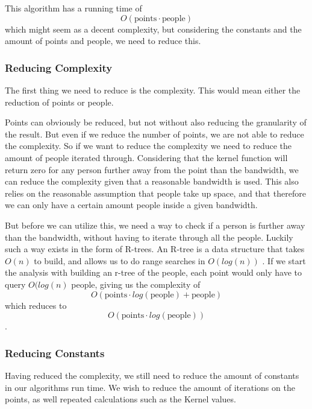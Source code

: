 This algorithm has a running time of $$O(\text{points} \cdot \text{people})$$ which might seem as a decent complexity, but considering the constants and the amount of points and people, we need to reduce this.


\subsubsection{Reducing Complexity}

The first thing we need to reduce is the complexity. This would mean either the reduction of points or people.

Points can obviously be reduced, but not without also reducing the granularity of the result. But even if we reduce the number of points, we are not able to reduce the complexity. So if we want to reduce the complexity we need to reduce the amount of people iterated through. Considering that the kernel function will return zero for any person further away from the point than the bandwidth, we can reduce the complexity given that a reasonable bandwidth is used. This also relies on the reasonable assumption that people take up space, and that therefore we can only have a certain amount people inside a given bandwidth.

But before we can utilize this, we need a way to check if a person is further away than the bandwidth, without having to iterate through all the people. Luckily such a way exists in the form of R-trees. An R-tree is a data structure that takes $O(n)$ to build, and allows us to do range searches in $O(log(n))$ \cite{rtree}. If we start the analysis with building an r-tree of the people, each point would only have to query $O(log(n)$ people, giving us the complexity of $$O(\text{points} \cdot log(\text{people}) + \text{people})$$ which reduces to $$O(\text{points} \cdot log(\text{people}))$$.



\subsubsection{Reducing Constants}

Having reduced the complexity, we still need to reduce the amount of constants in our algorithms run time. We wish to reduce the amount of iterations on the points, as well repeated calculations such as the Kernel values.


